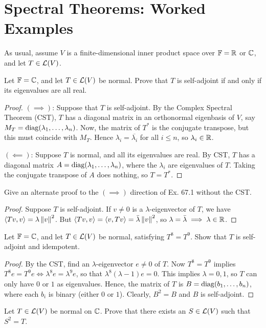 \documentclass{article}
\begin{document}
\section{Spectral Theorems: Worked Examples}
As usual, assume $V$ is a finite-dimensional inner product space over $\mathbb F = \mathbb R$ or $\mathbb C$, and let $T\in \mathcal L(V)$.
\begin{example}
Let $\mathbb F = \mathbb C$, and let $T\in\mathcal L(V)$ be normal. Prove that $T$ is self-adjoint if and only if its eigenvalues are all real.
\end{example}
\begin{proof}
$(\implies)$: Suppose that $T$ is self-adjoint. By the Complex Spectral Theorem (CST), $T$ has a diagonal matrix in an orthonormal eigenbasis of $V$, say $M_T = \operatorname{diag}(\lambda_1, \ldots, \lambda_n)$. Now, the matrix of $T^*$ is the conjugate transpose, but this must coincide with $M_T$. Hence $\lambda_i = \overline{\lambda_i}$ for all $i\leq n$, so $\lambda_i\in\mathbb R$.

$(\impliedby)$: Suppose $T$ is normal, and all its eigenvalues are real. By CST, $T$ has a diagonal matrix $A = \operatorname{diag}(\lambda_1, \ldots, \lambda_n)$, where the $\lambda_i$ are eigenvalues of $T$. Taking the conjugate transpose of $A$ does nothing, so $T = T^*$.
\end{proof}
\begin{example}
Give an alternate proof to the $(\implies)$ direction of Ex. 67.1 without the CST.
\end{example}
\begin{proof}
Suppose $T$ is self-adjoint. If $v\neq 0$ is a $\lambda$-eigenvector of $T$, we have $\left\langle Tv, v\right\rangle = \lambda\left\Vert v\right\Vert^2$. But $\left\langle Tv, v\right\rangle = \left\langle v, Tv\right\rangle = \bar\lambda\left\Vert v\right\Vert^2$, so $\lambda = \bar\lambda \implies \lambda\in\mathbb R$.
\end{proof}
\newpage
\begin{example}
Let $\mathbb F = \mathbb C$, and let $T\in\mathcal L(V)$ be normal, satisfying $T^8 = T^9$. Show that $T$ is self-adjoint and idempotent.
\end{example}
\begin{proof}
By the CST, find an $\lambda$-eigenvector $e\neq 0$ of $T$. Now $T^8=T^9$ implies $T^8e = T^9e \iff \lambda^8 e = \lambda^9e$, so that $\lambda^8(\lambda-1)e = 0$. This implies $\lambda = 0,1$, so $T$ can only have $0$ or $1$ as eigenvalues. Hence, the matrix of $T$ is $B = \operatorname{diag}(b_1, \ldots, b_n)$, where each $b_i$ is binary (either $0$ or $1$). Clearly, $B^2 = B$ and $B$ is self-adjoint.
\end{proof}
\begin{example}
Let $T\in\mathcal L(V)$ be normal on $\mathbb C$. Prove that there exists an $S\in\mathcal L(V)$ such that $S^2 = T$.
\end{example}
\end{document}
